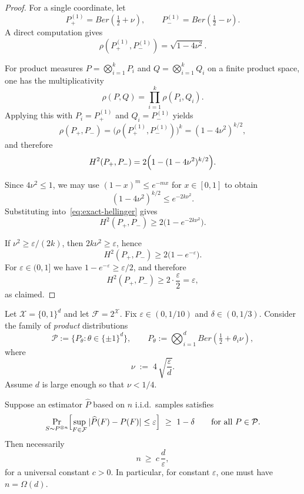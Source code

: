 \documentclass[arxiv]{colt2026}
\newcommand{\X}{\mathcal{X}}
\newcommand{\F}{\mathcal{F}}
\newcommand{\Pc}{\mathcal{P}}
\newcommand{\Ber}{Ber}
\newcommand{\eps}{\varepsilon}
\begin{document}
\begin{proof}
For a single coordinate, let
\[
P_+^{(1)}=\Ber\!\left(\tfrac12+\nu\right),
\qquad
P_-^{(1)}=\Ber\!\left(\tfrac12-\nu\right).
\]
A direct computation gives
\[
\rho\!\left(P_+^{(1)},P_-^{(1)}\right)
= \sqrt{1-4\nu^2}.
\]

For product measures $P=\bigotimes_{i=1}^k P_i$ and $Q=\bigotimes_{i=1}^k Q_i$
on a finite product space, one has the multiplicativity
\[
\rho(P,Q)=\prod_{i=1}^k \rho(P_i,Q_i).
\]
Applying this with $P_i=P_+^{(1)}$ and $Q_i=P_-^{(1)}$ yields
\[
\rho(P_+,P_-)
= \bigl(\rho(P_+^{(1)},P_-^{(1)})\bigr)^k
= (1-4\nu^2)^{k/2},
\]
and therefore
\begin{equation}
H^2(P_+,P_-)
= 2\Bigl(1-(1-4\nu^2)^{k/2}\Bigr).
\label{eq:exact-hellinger}
\end{equation}

Since $4\nu^2\le 1$, we may use $(1-x)^m\le e^{-mx}$ for $x\in[0,1]$ to obtain
\[
(1-4\nu^2)^{k/2}\le e^{-2k\nu^2}.
\]
Substituting into~\eqref{eq:exact-hellinger} gives
\[
H^2(P_+,P_-)\ge 2\bigl(1-e^{-2k\nu^2}\bigr).
\]

If $\nu^2\ge \eps/(2k)$, then $2k\nu^2\ge \eps$, hence
\[
H^2(P_+,P_-)\ge 2\bigl(1-e^{-\eps}\bigr).
\]
For $\eps\in(0,1]$ we have $1-e^{-\eps}\ge \eps/2$, and therefore
\[
H^2(P_+,P_-)\ge 2\cdot \frac{\eps}{2}=\eps,
\]
as claimed.
\end{proof}


\begin{proposition}
\label{prop:Omega-d-product}
Let $\X=\{0,1\}^d$ and let $\F=2^\X$.
Fix $\eps\in(0,1/10)$ and $\delta\in(0,1/3)$.
Consider the family of \emph{product} distributions
\[
\Pc := \{P_\theta : \theta\in\{\pm1\}^d\},
\qquad
P_\theta := \bigotimes_{i=1}^d \Ber\!\left(\tfrac12+\theta_i \nu\right),
\]
where
\[
\nu \;:=\; 4\,\sqrt{\frac{\eps}{d}}.
\]
Assume $d$ is large enough so that $\nu<1/4$.

Suppose an estimator $\widehat P$ based on $n$ i.i.d.\ samples satisfies
\[
\Pr_{S\sim P^{\otimes n}}
\Bigl[
\sup_{F\in\F}|\widehat P(F)-P(F)| \le \eps
\Bigr]\ \ge\ 1-\delta
\qquad\text{for all }P\in\Pc.
\]
Then necessarily
\[
n \ \ge\ c\,\frac{d}{\eps},
\]
for a universal constant $c>0$.
In particular, for constant $\eps$, one must have $n=\Omega(d)$.
\end{proposition}
\end{document}
